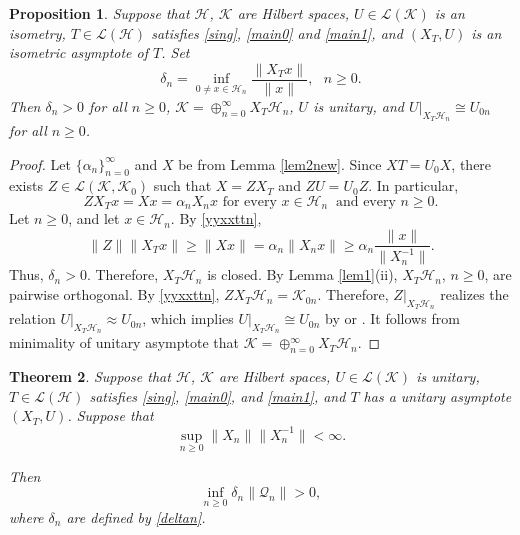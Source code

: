 \documentclass[a4paper,oneside,11pt]{amsart}
\numberwithin{equation}{section}
\theoremstyle{plain}
\newtheorem{theorem}{Theorem}[section]
\newtheorem{proposition}[theorem]{Proposition}
\theoremstyle{definition}
\begin{document}
\begin{proposition} \label{thm1} Suppose that $\mathcal H$,  $\mathcal K$ are Hilbert spaces,  $U\in\mathcal L(\mathcal K)$ is an isometry, 
  $T\in  \mathcal L(\mathcal H)$ satisfies  \eqref{sing}, \eqref{main0} and \eqref{main1}, and   
  $(X_T,U)$ is an isometric asymptote of $T$. 
Set 
\begin{equation}\label{deltan} \delta_n=\inf_{0\neq x\in\mathcal H_n}\frac{\|X_Tx\|}{\|x\|}, \ \ \ n\geq 0.\end{equation}
Then $\delta_n>0$ for all $n\geq 0$, $\mathcal K =\oplus_{n=0}^\infty X_T\mathcal H_n$, $U$ is unitary, 
and $U|_{X_T\mathcal H_n}\cong U_{0n}$ for all $n\geq 0$.
\end{proposition}

\begin{proof} Let  $\{\alpha_n\}_{n=0}^\infty$ and $X$ be from Lemma \ref{lem2new}.  
 Since $XT=U_0X$, there exists $Z\in\mathcal L(\mathcal K,\mathcal K_0)$ 
such that $X=ZX_T$ and $ZU=U_0Z$. 
In particular, 
\begin{equation} \label{yyxxttn} ZX_T x=Xx=\alpha_n X_n x \text{ for every } x\in\mathcal H_n \ \text{ and every }
n\geq 0.\end{equation} 
Let  $n\geq 0$, and let $x\in\mathcal H_n$.  
By \eqref{yyxxttn},  
$$ \|Z\|\|X_T x\|\geq\|Xx\|=\alpha_n\| X_n x\|\geq\alpha_n\frac{\|x\|}{\|X_n^{-1}\|}.$$
Thus, $\delta_n>0$. 
Therefore, $X_T\mathcal H_n$ is closed. By Lemma \ref{lem1}(ii),  $X_T\mathcal H_n$, $n\geq 0$, are pairwise orthogonal. 
By \eqref{yyxxttn}, $ZX_T\mathcal H_n=\mathcal K_{0n}$. Therefore, 
$Z|_{X_T\mathcal H_n}$ realizes the relation $U|_{X_T\mathcal H_n}\approx U_{0n}$, which implies
  $U|_{X_T\mathcal H_n}\cong U_{0n}$ by {\cite[Proposition II.3.4]{nfbk}} or {\cite[Proposition II.10.6]{conway}}. 
It follows from minimality of unitary asymptote that $\mathcal K=\oplus _{n=0}^\infty X_T\mathcal H_n$.
\end{proof}

\begin{theorem}\label{thm15} Suppose that $\mathcal H$, $\mathcal K$ are Hilbert spaces,  $U\in\mathcal L(\mathcal K)$ is unitary, 
  $T\in  \mathcal L(\mathcal H)$ satisfies  \eqref{sing},  \eqref{main0}, and \eqref{main1}, and   
 $T$ has a unitary asymptote $(X_T,U)$. 
Suppose that \begin{equation} \label{xxnxxn1}\sup_{n\geq 0}\|X_n\|\|X_n^{-1}\|<\infty. \end{equation} 

Then \begin{equation} \label{deltanqqn} \inf_{n\geq 0} \delta_n\|\mathcal Q_n\|>0, \end{equation} 
where $\delta_n$ are defined by \eqref{deltan}.  
\end{theorem}
\end{document}
